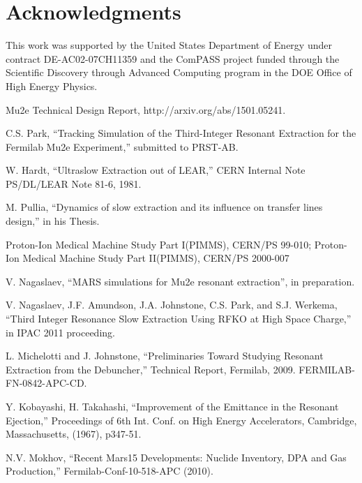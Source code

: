\documentclass[aps,prstab,onecolumn,preprint]{revtex4-1}
\begin{document}
\section{\label{thanks}Acknowledgments}

This work was supported by the United States Department of Energy under contract DE-AC02-07CH11359 and the ComPASS project funded through the Scientific Discovery through Advanced Computing program in the DOE Office of High Energy Physics.


\begin{thebibliography}{77}
  Mu2e Technical Design Report, http://arxiv.org/abs/1501.05241.

  C.S. Park, ``Tracking Simulation of the Third-Integer Resonant Extraction for the Fermilab Mu2e Experiment,'' submitted to PRST-AB.

  W. Hardt, ``Ultraslow Extraction out of LEAR,'' CERN Internal Note PS/DL/LEAR Note 81-6, 1981.

  M. Pullia, ``Dynamics of slow extraction and its influence on transfer lines design,'' in his Thesis.

  Proton-Ion Medical Machine Study Part I(PIMMS), CERN/PS 99-010; Proton-Ion Medical Machine Study Part II(PIMMS), CERN/PS 2000-007


  V. Nagaslaev, ``MARS simulations for Mu2e resonant extraction'', in preparation.

  V. Nagaslaev, J.F. Amundson, J.A. Johnstone, C.S. Park, and S.J. Werkema,  ``Third Integer Resonance Slow Extraction Using RFKO at High Space Charge,'' in  IPAC 2011 proceeding.

  L. Michelotti and J. Johnstone, ``Preliminaries Toward Studying Resonant Extraction from the Debuncher,'' Technical Report, Fermilab, 2009. FERMILAB-FN-0842-APC-CD.

  Y. Kobayashi, H. Takahashi, ``Improvement of the Emittance in the Resonant Ejection,'' Proceedings of 6th Int. Conf. on High Energy Accelerators, Cambridge, Massachusetts, (1967), p347-51.

  N.V. Mokhov, ``Recent Mars15 Developments: Nuclide Inventory, DPA and Gas Production,'' Fermilab-Conf-10-518-APC (2010).


\end{thebibliography}
\end{document}

